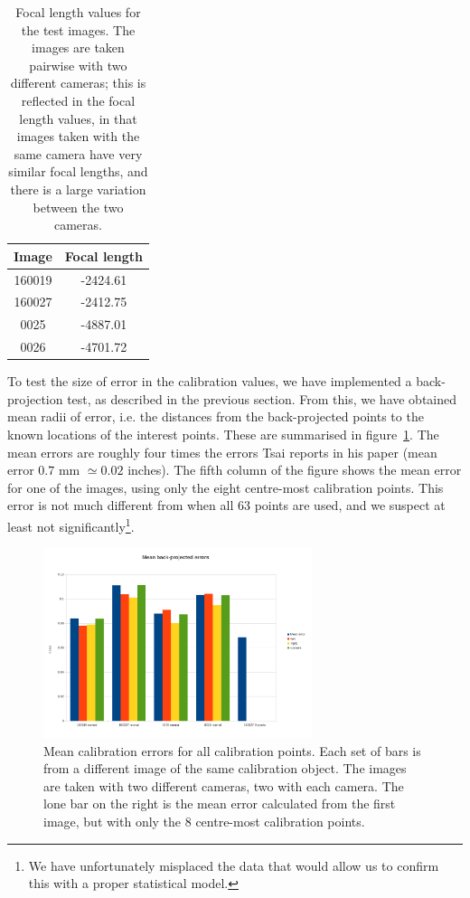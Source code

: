 \begin{table}[h]
  \centering
  \begin{tabular}{c c}
    \toprule
    \textbf{Image} & \textbf{Focal length}\\
    \midrule
    160019 & -2424.61\\
    160027 & -2412.75\\
    0025 & -4887.01\\
    0026 & -4701.72\\
    \bottomrule
  \end{tabular}
  \caption[Focal length values for the test images]{Focal length
    values for the test images. The images are taken pairwise with two
    different cameras; this is reflected in the focal length values,
    in that images taken with the same camera have very similar focal
    lengths, and there is a large variation between the two cameras.}
  \label{tbl:focal-lengths}
\end{table}

To test the size of error in the calibration values, we have
implemented a back-projection test, as described in the previous
section. From this, we have obtained mean radii of error, i.e. the
distances from the back-projected points to the known locations of the
interest points. These are summarised in
figure~\ref{fig:calib-errors}. The mean errors are roughly four times
the errors Tsai reports in his paper (mean error $0.7$ mm $\simeq0.02$
inches). The fifth column of the figure shows the mean error for one
of the images, using only the eight centre-most calibration points.
This error is not much different from when all 63 points are used, and
we suspect at least not significantly\footnote{We have unfortunately
  misplaced the data that would allow us to confirm this with a proper
  statistical model.}.

\begin{figure}[htb]
  \centering
  \includegraphics[width=0.7\textwidth]{figures/calibration-means}
  \caption[Mean calibration errors]{Mean calibration errors for all
    calibration points. Each set of bars is from a different image of
    the same calibration object. The images are taken with two
    different cameras, two with each camera. The lone bar on the right
    is the mean error calculated from the first image, but with only
    the 8 centre-most calibration points.}
  \label{fig:calib-errors}
\end{figure}



